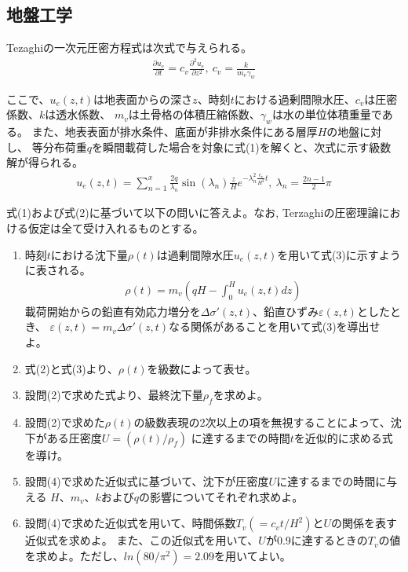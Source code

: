 \subsection{地盤工学}
Tezaghiの一次元圧密方程式は次式で与えられる。
\begin{align*}%
  \frac{\partial u_e}{\partial t} = c_v \frac{\partial^2u_e}{\partial z^2},\:
  c_v = \frac{k}{m_v \gamma_w}
\end{align*}

ここで、$u_e(z,t)$は地表面からの深さ$z$、時刻$t$における過剰間隙水圧、$c_v$は圧密係数、$k$は透水係数、
$m_v$は土骨格の体積圧縮係数、$\gamma_w$は水の単位体積重量である。
また、地表表面が排水条件、底面が非排水条件にある層厚$H$の地盤に対し、
等分布荷重$q$を瞬間載荷した場合を対象に式(1)を解くと、次式に示す級数解が得られる。
\begin{align*}%
  u_e(z,t) = \sum_{n=1}^{x}\frac{2q}{\lambda_n}\sin(\lambda_n)\frac{z}{H}e^{-\lambda_n^2\frac{c_v}{H^2}t},\:
  \lambda_n = \frac{2n-1}{2}\pi
\end{align*}

式(1)および式(2)に基づいて以下の問いに答えよ。なお, Terzaghiの圧密理論における仮定は全て受け入れるものとする。
\begin{enumerate}[(1)]
  \item 時刻$t$における沈下量$\rho(t)$は過剰間隙水圧$u_e(z,t)$を用いて式(3)に示すように表される。
        \begin{align*}%
          \rho(t) = m_v(qH - \int_{0}^{H}u_e(z,t)dz)
        \end{align*}
        載荷開始からの鉛直有効応力増分を$\Delta \sigma'(z,t)$、鉛直ひずみ$\varepsilon(z,t)$としたとき、
        $\varepsilon(z,t)=m_v\Delta \sigma'(z,t)$なる関係があることを用いて式(3)を導出せよ。
  \item 式(2)と式(3)より、$\rho(t)$を級数によって表せ。
  \item 設問(2)で求めた式より、最終沈下量$\rho_f$を求めよ。
  \item 設問(2)で求めた$\rho(t)$の級数表現の2次以上の項を無視することによって、沈下がある圧密度$U=(\rho(t)/\rho_f)$
        に達するまでの時間$t$を近似的に求める式を導け。
  \item 設問(4)で求めた近似式に基づいて、沈下が圧密度$U$に達するまでの時間に与える
        $H$、$m_v$、$k$および$q$の影響についてそれぞれ求めよ。
  \item 設問(4)で求めた近似式を用いて、時間係数$T_v(=c_vt/H^2)$と$U$の関係を表す近似式を求めよ。
        また、この近似式を用いて、$U$が0.9に達するときの$T_v$の値を求めよ。ただし、$ln(80/\pi^2)=2.09$を用いてよい。
\end{enumerate}